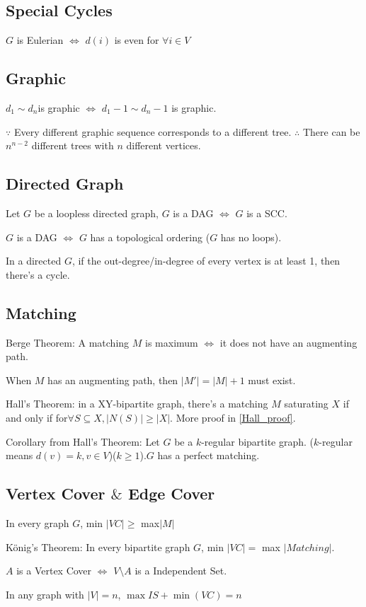 \documentclass[12pt,a4paper]{ctexrep}
\begin{document}
\subsection{Special Cycles}
$G$ is Eulerian $\iff$ $d(i)$ is even for $\forall i \in V$
\subsection{Graphic}
$d_{1} \sim d_{n}$is graphic $\iff$ $d_{1}-1 \sim d_{n}-1$ is graphic.

$\because$ Every different graphic sequence corresponds to a different tree. $\therefore$ There can be $n^{n-2}$ different trees with $n$ different vertices.
\subsection{Directed Graph}
Let $G$ be a loopless directed graph, $G$ is a DAG $\iff$ $G$ is a SCC.

$G$ is a DAG $\iff$ $G$ has a topological ordering ($G$ has no loops).

In a directed $G$, if the out-degree/in-degree of every vertex is at least 1, then there's a cycle.
\subsection{Matching}
Berge Theorem: A matching $M$ is maximum $\iff$ it does not have an augmenting path.

When $M$ has an augmenting path, then $|M'| = |M|+1$ must exist.

Hall's Theorem: in a XY-bipartite graph, there's a matching $M$ saturating $X$ if and only if for$\forall S \subseteq X, |N(S)|\geq |X|$. More proof in \hyperlink{Hall_proof}{\ref{Hall_proof}}. \label{Hall_theorem}\hypertarget{Hall_theorem}{}

Corollary from Hall's Theorem: Let $G$ be a $k$-regular bipartite graph. ($k$-regular means $d(v) = k,v\in V$)($k\geq 1$).$G$ has a perfect matching.
\subsection{Vertex Cover $\&$ Edge Cover}
In every graph $G$, min $|VC| \geq$ max$|M|$

K\"{o}nig's Theorem: In every bipartite graph $G$, min $|VC|=$ max $|Matching|$.

$A$ is a Vertex Cover $\iff$ $V \setminus A$ is a Independent Set.

In any graph with $|V|=n$, $\max{IS}+\min(VC)=n$
\end{document}
